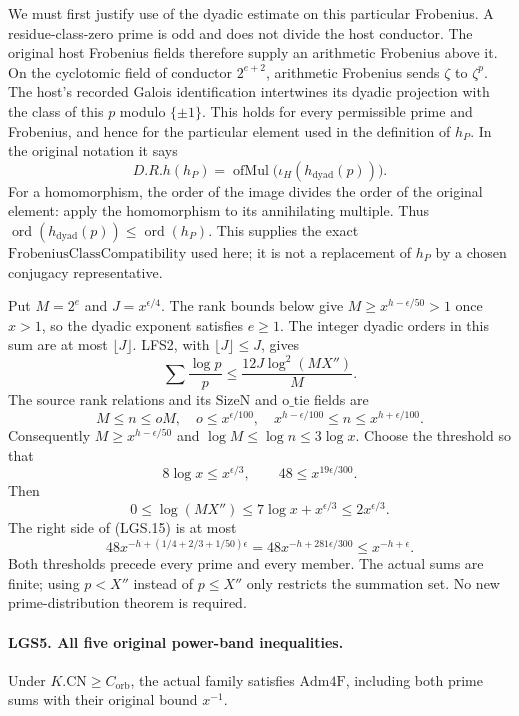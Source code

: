 \documentclass[11pt,a4paper]{article}
\numberwithin{equation}{section}
\theoremstyle{remark}\newtheorem{remark}[theorem]{Remark}
\begin{document}
We must first justify use of the dyadic estimate on this
particular Frobenius.  A residue-class-zero prime is odd and
does not divide the host conductor.  The original host
Frobenius fields therefore supply an arithmetic Frobenius
above it.  On the cyclotomic field of conductor \(2^{e+2}\),
arithmetic Frobenius sends \(\zeta\) to \(\zeta^p\).
The host's recorded Galois identification intertwines its
dyadic projection with the class of this \(p\) modulo
\(\{\pm1\}\).  This holds for every permissible prime and
Frobenius, and hence for the particular element used in the
definition of \(h_P\).  In the original notation it says
\[
 D.R.h(h_P)=
   \operatorname{ofMul}\!\bigl(\iota_H(h_{\mathrm{dyad}}(p))\bigr).
                                                               \tag{LGS.14}
\]
For a homomorphism, the order of the image divides the order
of the original element: apply the homomorphism to its
annihilating multiple.  Thus
\(\operatorname{ord}(h_{\mathrm{dyad}}(p))
 \le\operatorname{ord}(h_P)\).
This supplies the exact \(\mathrm{FrobeniusClassCompatibility}\)
used here; it is not a replacement of \(h_P\) by a chosen
conjugacy representative.

Put \(M=2^e\) and \(J=x^{\epsilon/4}\).
The rank bounds below give \(M\ge x^{h-\epsilon/50}>1\)
once \(x>1\), so the dyadic exponent satisfies \(e\ge1\).
The integer dyadic orders in this sum are at most
\(\lfloor J\rfloor\).  LFS2, with
\(\lfloor J\rfloor\le J\), gives
\[
 \sum\frac{\log p}{p}
       \le\frac{12J\log^2(MX'')}{M}.                  \tag{LGS.15}
\]
The source rank relations and its \(\mathrm{SizeN}\) and
\(\mathrm{o\_\allowbreak tie}\) fields are
\[
 M\le n\le oM,\quad o\le x^{\epsilon/100},\quad
 x^{h-\epsilon/100}\le n\le x^{h+\epsilon/100}.
 \]
Consequently \(M\ge x^{h-\epsilon/50}\) and
\(\log M\le\log n\le3\log x\).
Choose the threshold so that
\[
 8\log x\le x^{\epsilon/3},\qquad
                  48\le x^{19\epsilon/300}.
 \]
Then
\[
 0\le\log(MX'')\le
       7\log x+x^{\epsilon/3}\le2x^{\epsilon/3}.
 \]
The right side of (LGS.15) is at most
\[
 48x^{-h+(1/4+2/3+1/50)\epsilon}
 =48x^{-h+281\epsilon/300}
 \le x^{-h+\epsilon}.
 \]
Both thresholds precede every prime and every member.
The actual sums are finite; using \(p<X''\) instead of
\(p\le X''\) only restricts the summation set.
No new prime-distribution theorem is required.

\paragraph{LGS5. All five original power-band inequalities.}
\label{claim:LGS5}
Under \(K.\mathrm{CN}\ge C_{\mathrm{orb}}\), the actual family
satisfies \(\mathrm{Adm4F}\), including both prime sums with
their original bound \(x^{-1}\).
\end{document}
